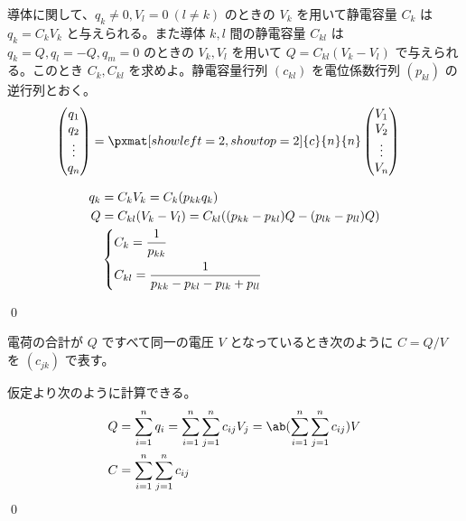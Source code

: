 \documentclass[uplatex,dvipdfmx,a4paper,11pt]{jlreq}
\makeatletter
\newcommand\mqty[1]{\begin{pmatrix}#1\end{pmatrix}}
\numberwithin{equation}{section}
\theoremstyle{definition}
\renewenvironment{proof}[1][\proofname]{\par
  \normalfont
  \topsep6\p@\@plus6\p@ \trivlist
  \item[\hskip\labelsep{\bfseries #1}\@addpunct{\bfseries}]\ignorespaces\quad\par
}{%
  \qed\endtrivlist\@endpefalse
}
\renewcommand\proofname{証明}
\makeatother
\begin{document}
\begin{problem}
導体に関して、$q_k \neq 0, V_l = 0\ (l\neq k)$ のときの $V_k$ を用いて静電容量 $C_k$ は $q_k = C_kV_k$ と与えられる。また導体 $k, l$ 間の静電容量 $C_{kl}$ は $q_k = Q, q_l = -Q, q_m = 0$ のときの $V_k, V_l$ を用いて $Q = C_{kl}(V_k - V_l)$ で与えられる。このとき $C_k, C_{kl}$ を求めよ。静電容量行列 $(c_{kl})$ を電位係数行列 $(p_{kl})$ の逆行列とおく。
\begin{align}
  \mqty{q_1 \\ q_2 \\ \vdots \\ q_n} & = \pxmat[showleft=2,showtop=2]{c}{n}{n}\mqty{V_1 \\ V_2 \\ \vdots \\ V_n}
\end{align}
\end{problem}
\begin{proof}
  \begin{align}
    q_k & = C_kV_k = C_k(p_{kk}q_k)                                                                                                                           \\
    Q   & = C_{kl}(V_k - V_l) = C_{kl}((p_{kk} - p_{kl})Q - (p_{lk} - p_{ll})Q)                                                                               \\
        & \begin{dcases}
            C_k = \frac{1}{p_{kk}} \\
            C_{kl} = \frac{1}{p_{kk} - p_{kl} - p_{lk} + p_{ll}}
          \end{dcases}
  \end{align}

\end{proof}

\begin{problem}
電荷の合計が $Q$ ですべて同一の電圧 $V$ となっているとき次のように $C = Q/V$ を $(c_{jk})$ で表す。
\end{problem}
\begin{proof}
  仮定より次のように計算できる。
  \begin{align}
    Q & = \sum_{i=1}^{n}q_i = \sum_{i=1}^{n}\sum_{j=1}^{n}c_{ij}V_j = \ab(\sum_{i=1}^{n}\sum_{j=1}^{n}c_{ij})V \\
    C & = \sum_{i=1}^{n}\sum_{j=1}^{n}c_{ij}
  \end{align}
\end{proof}
\end{document}
